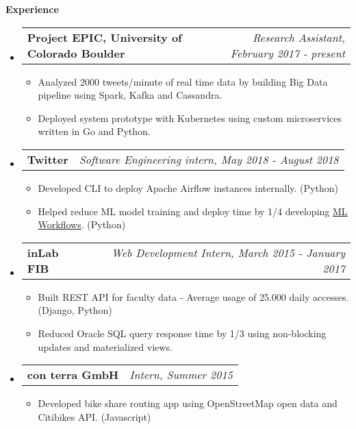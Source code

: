 \documentclass[letterpaper,10pt]{article}
\makeatletter
\newcommand{\resitem}[1]{\item #1 \vspace{-2pt}}
\newcommand{\resheading}[1]{{\large \colorbox{mygrey}{\begin{minipage}{\textwidth}{\textbf{#1 \vphantom{p\^{E}}}}\end{minipage}}}}
\newcommand{\ressubheading}[4]{
\begin{tabular*}{7.0in}{l@{\extracolsep{\fill}}r}
		\textbf{#1} & \textit{#4} \\
\end{tabular*}\vspace{-6pt}}
\makeatother
\begin{document}
\resheading{Experience}
	\begin{itemize}
		\item
			\ressubheading{Project EPIC, University of Colorado Boulder}{Boulder, CO}{Research Assistant}{Research Assistant, February 2017 - present}
			\begin{itemize}
				\resitem{Analyzed 2000 tweets/minute of real time data by building Big Data pipeline using Spark, Kafka and Cassandra.} 
				\resitem{Deployed system prototype with Kubernetes using custom microservices written in Go and Python.}
			\end{itemize}
			\item
			\ressubheading{Twitter}{Boulder, CO}{Software Engineering intern}{Software Engineering intern, May 2018 - August 2018}
			\begin{itemize}
				\resitem{Developed CLI to deploy Apache Airflow instances internally. (Python)}
				\resitem{Helped reduce ML model training and deploy time by 1/4 developing \href{https://blog.twitter.com/engineering/en_us/topics/insights/2018/ml-workflows.html}{ML Workflows}. (Python)}
			\end{itemize}
		\item
			\ressubheading{inLab FIB}{Barcelona, Spain}{Web Development Intern}{Web Development Intern, March 2015 - January 2017}
			\begin{itemize}
				\resitem{Built REST API for faculty data - Average usage of 25.000 daily accesses. (Django, Python)}
				\resitem{Reduced Oracle SQL query response time by 1/3 using non-blocking updates and materialized views.}
			\end{itemize}

		\item
			\ressubheading{con terra GmbH}{Münster, Germany}{Intern}{Intern, Summer 2015}
			\begin{itemize}
				\resitem{Developed bike share routing app using OpenStreetMap open data and Citibikes API. (Javascript)}
			\end{itemize}
	\end{itemize}
\end{document}
